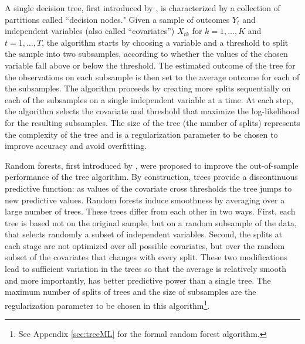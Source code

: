 \documentclass[12pt]{article}
\begin{document}

A single decision tree, first introduced by \cite{breiman1984classification}, is characterized by a collection of partitions called ``decision nodes." Given a sample of outcomes $Y_t$ and independent variables (also called “covariates”) $X_{tk}$ for $k=1,…,K$ and $t=1,…,T$, the algorithm starts by choosing a variable and a threshold to split the sample into two subsamples, according to whether the values of the chosen variable fall above or below the threshold.  The estimated outcome of the tree for the observations on each subsample is then set to the average outcome for each of the subsamples.  The algorithm proceeds by creating more splits sequentially on each of the subsamples on a single independent variable at a time.  At each step, the algorithm selects the covariate and threshold that maximize the log-likelihood for the resulting subsamples.  The size of the tree (the number of splits) represents the complexity of the tree and is a regularization parameter to be chosen to improve accuracy and avoid overfitting.

 Random forests, first introduced by \cite{breiman2001random},  were proposed to improve the out-of-sample performance of the tree algorithm. By construction, trees provide a discontinuous predictive function: as values of the covariate cross thresholds the tree jumps to new predictive values.  Random forests induce smoothness by averaging over a large number of trees. These trees differ from each other in two ways.  First, each tree is based not on the original sample, but on a random subsample of the data, that selects randomly a subset of independent variables.  Second, the splits at each stage are not optimized over all possible covariates, but over the random subset of the covariates that changes with every split. These two modifications lead to sufficient variation in the trees so that the average is relatively smooth and more importantly, has better predictive power than a single tree. The maximum number of splits of trees and the size of subsamples are the regularization parameter to be chosen in this algorithm\footnote{See Appendix \ref{sec:treeML} for the formal random forest algorithm.}.
\end{document}

